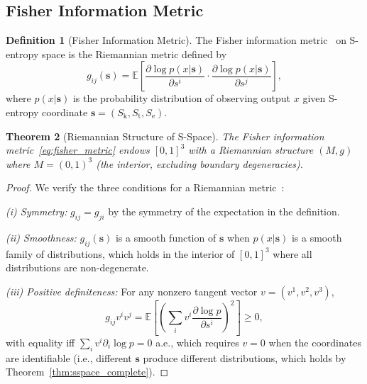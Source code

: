 \documentclass[11pt,twocolumn,a4paper]{article}
\newtheorem{theorem}{Theorem}[section]
\theoremstyle{definition}
\newtheorem{definition}[theorem]{Definition}
\newcommand{\Sk}{S_{\mathrm{k}}}
\newcommand{\St}{S_{\mathrm{t}}}
\newcommand{\Se}{S_{\mathrm{e}}}
\begin{document}
\subsection{Fisher Information Metric}\label{sec:infogeo:fisher}

\begin{definition}[Fisher Information Metric]\label{def:fisher_metric}
The Fisher information metric~\cite{fisher1925,amari1985} on S-entropy space is the
Riemannian metric defined by
\begin{equation}\label{eq:fisher_metric}
  g_{ij}(\mathbf{s}) = \mathbb{E}\!\left[\frac{\partial \log p(x|\mathbf{s})}{\partial s^i}
  \cdot \frac{\partial \log p(x|\mathbf{s})}{\partial s^j}\right],
\end{equation}
where $p(x|\mathbf{s})$ is the probability distribution of observing output $x$ given
S-entropy coordinate $\mathbf{s} = (\Sk, \St, \Se)$.
\end{definition}

\begin{theorem}[Riemannian Structure of S-Space]\label{thm:riemannian}
The Fisher information metric~\eqref{eq:fisher_metric} endows $[0,1]^3$ with a Riemannian
structure $(M, g)$ where $M = (0,1)^3$ (the interior, excluding boundary degeneracies).
\end{theorem}

\begin{proof}
We verify the three conditions for a Riemannian metric~\cite{nakahara2003}:

\emph{(i) Symmetry:} $g_{ij} = g_{ji}$ by the symmetry of the expectation in the
definition.

\emph{(ii) Smoothness:} $g_{ij}(\mathbf{s})$ is a smooth function of $\mathbf{s}$ when
$p(x|\mathbf{s})$ is a smooth family of distributions, which holds in the interior of
$[0,1]^3$ where all distributions are non-degenerate.

\emph{(iii) Positive definiteness:} For any nonzero tangent vector $v = (v^1, v^2, v^3)$,
\begin{equation}
  g_{ij} v^i v^j = \mathbb{E}\!\left[\left(\sum_i v^i \frac{\partial \log p}{\partial s^i}
  \right)^2\right] \geq 0,
\end{equation}
with equality iff $\sum_i v^i \partial_i \log p = 0$ a.e., which requires $v = 0$ when
the coordinates are identifiable (i.e., different $\mathbf{s}$ produce different
distributions, which holds by Theorem~\ref{thm:sspace_complete}).
\end{proof}
\end{document}
